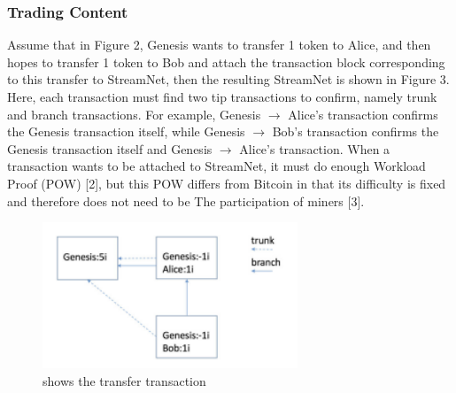 \subsubsection{Trading Content}
Assume that in Figure 2, Genesis wants to transfer 1 token to Alice, and then hopes to transfer 1 token to Bob and attach the transaction block corresponding to this transfer to StreamNet, then the resulting StreamNet is shown in Figure 3. Here, each transaction must find two tip transactions to confirm, namely trunk and branch transactions. For example, Genesis $\rightarrow$ Alice's transaction confirms the Genesis transaction itself, while Genesis $\rightarrow$ Bob's transaction confirms the Genesis transaction itself and Genesis $\rightarrow$ Alice's transaction. When a transaction wants to be attached to StreamNet, it must do enough Workload Proof (POW) [2], but this POW differs from Bitcoin in that its difficulty is fixed and therefore does not need to be The participation of miners [3].

\begin{figure}[H]
	\centering
	\includegraphics[width=3.0in]{figures/screenshot003.png}
	\caption{shows the transfer transaction}
	\label{simulationfigure}
\end{figure}

